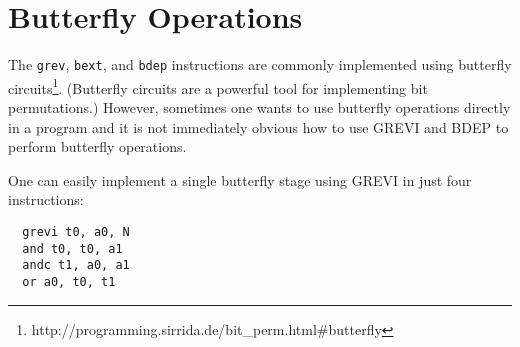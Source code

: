 %
%
%
%

\section{Butterfly Operations}

The \texttt{grev}, \texttt{bext}, and \texttt{bdep} instructions are commonly
implemented using butterfly circuits\footnote{http://programming.sirrida.de/bit\_perm.html\#butterfly}.
(Butterfly circuits are a powerful tool for implementing bit permutations.)
However, sometimes one wants to use butterfly operations directly in a program
and it is not immediately obvious how to use GREVI and BDEP to perform
butterfly operations.

One can easily implement a single butterfly stage using GREVI in just four
instructions:

\begin{verbatim}
  grevi t0, a0, N
  and t0, t0, a1
  andc t1, a0, a1
  or a0, t0, t1
\end{verbatim}

